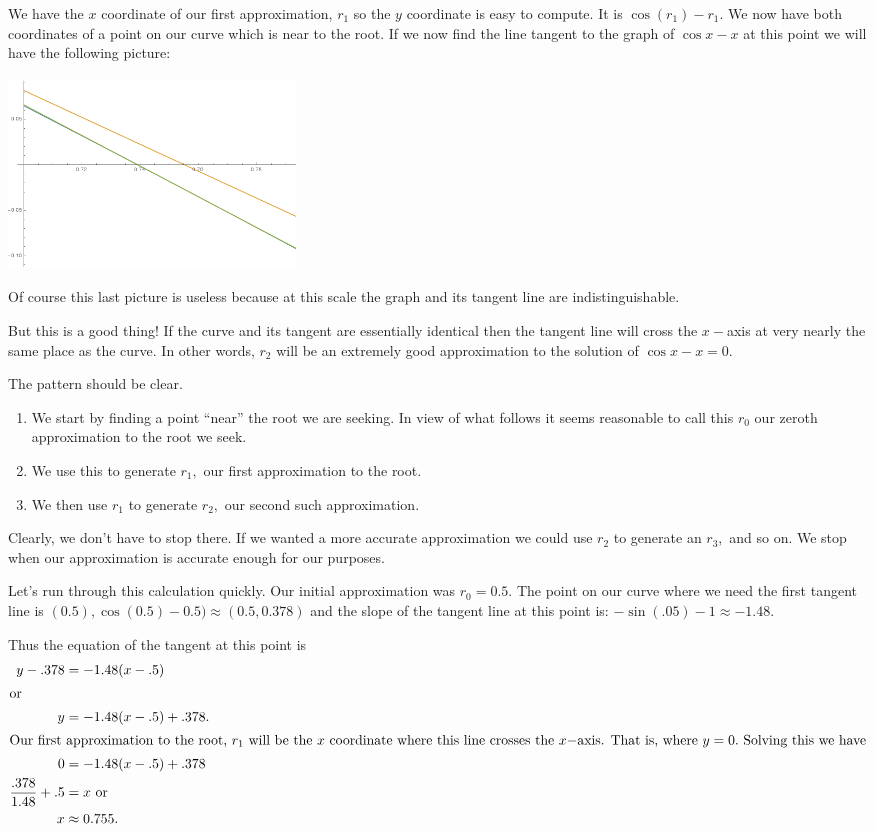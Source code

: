 We have the $x$ coordinate of our first approximation, $r_1$ so the
$y$ coordinate is easy to compute. It is $\cos(r_1)-r_1.$ We now have
both coordinates of a point on our curve which is near to the
root. If we now find the line tangent to the graph of $\cos x -x $ at
this point we will have the following picture:\\
\centerline{\includegraphics*[height=2in,width=3in]{Figures/cosx-x4}}
Of course this last picture is useless because at this scale the graph
and its tangent line are indistinguishable. 

But this is a good thing! If the curve and its tangent are essentially
identical then the tangent line will cross the $x-$axis at very nearly
the same place as the curve. In other words, $r_2$ will be an
extremely good approximation to the solution of $\cos x -x =0.$ 

The pattern should be clear. 
\begin{enumerate}
\item We start by finding a point ``near'' the root we are seeking. In
  view of what follows it seems reasonable to call this $r_0$ our
  zeroth approximation to the root we seek.
\item We use this to generate $r_1,$ our first approximation to the
  root.
\item We then use $r_1$ to generate $r_2,$ our second such
  approximation.
\end{enumerate}
Clearly, we don't have to stop there. If we wanted a more accurate
approximation we could use $r_2$ to generate an $r_3,$ and so on. We
stop when our approximation is accurate enough for our purposes.

\begin{myexample}{}
  Let's run through this calculation quickly. Our initial
  approximation was $r_0=0.5.$ The point on our curve where we need
  the first tangent line is $(0.5), \cos(0.5)-0.5) \approx (0.5,
  0.378)$ and the slope of the tangent line at this point is:
  $-\sin(.05)-1\approx -1.48.$ 

  Thus the equation of the tangent at this point is
  \begin{align*}
    y-.378&=-1.48(x-.5)\\
\intertext{or}
    y&=-1.48(x-.5)+.378.\\
\intertext{Our first approximation to the root, $r_1$ will be the $x$
  coordinate where this line crosses the $x-$axis. That is, where
  $y=0.$ Solving this we have}
    0&=-1.48(x-.5)+.378\\
    \frac{.378}{1.48}+.5&=x \text{ or}\\
x&\approx 0.755.
  \end{align*}
\end{myexample}

